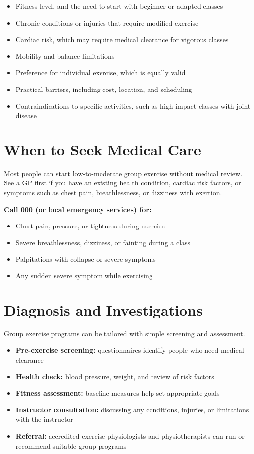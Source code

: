 \begin{itemize}
    \item Fitness level, and the need to start with beginner or adapted classes
    \item Chronic conditions or injuries that require modified exercise
    \item Cardiac risk, which may require medical clearance for vigorous classes
    \item Mobility and balance limitations
    \item Preference for individual exercise, which is equally valid
    \item Practical barriers, including cost, location, and scheduling
    \item Contraindications to specific activities, such as high-impact classes with joint disease
\end{itemize}

\section*{When to Seek Medical Care}
Most people can start low-to-moderate group exercise without medical review. See a GP first if you have an existing health condition, cardiac risk factors, or symptoms such as chest pain, breathlessness, or dizziness with exertion.

\textbf{Call 000 (or local emergency services) for:}
\begin{itemize}
    \item Chest pain, pressure, or tightness during exercise
    \item Severe breathlessness, dizziness, or fainting during a class
    \item Palpitations with collapse or severe symptoms
    \item Any sudden severe symptom while exercising
\end{itemize}

\section*{Diagnosis and Investigations}
Group exercise programs can be tailored with simple screening and assessment.

\begin{itemize}
    \item \textbf{Pre-exercise screening:} questionnaires identify people who need medical clearance
    \item \textbf{Health check:} blood pressure, weight, and review of risk factors
    \item \textbf{Fitness assessment:} baseline measures help set appropriate goals
    \item \textbf{Instructor consultation:} discussing any conditions, injuries, or limitations with the instructor
    \item \textbf{Referral:} accredited exercise physiologists and physiotherapists can run or recommend suitable group programs
\end{itemize}

